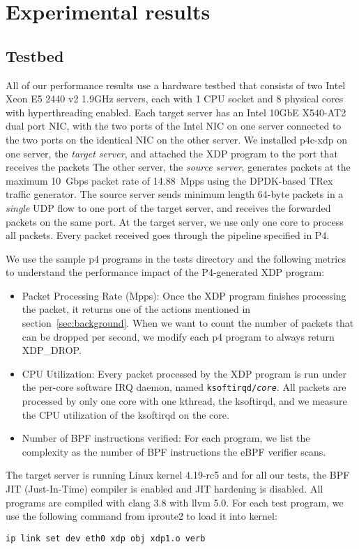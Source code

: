 \section{Experimental results}\label{sec:results}
\subsection{Testbed}
All of our performance results use a hardware testbed that consists of
two Intel Xeon E5 2440 v2 1.9GHz servers, each with 1 CPU socket and
8 physical cores with hyperthreading enabled.
Each target server has an Intel 10GbE X540-AT2 dual
port NIC, with the two ports of the Intel NIC on one server connected
to the two ports on the identical NIC on the other server.
We installed p4c-xdp on one server, the {\em target server}, and
attached the XDP program to the port that receives the packets
The other server, the {\em source server}, generates packets
at the maximum 10~Gbps packet rate of 14.88~Mpps using the DPDK-based
TRex~\cite{trex} traffic generator.  The source server sends minimum
length 64-byte packets in a {\em single} UDP flow to one port of the
target server, and receives the forwarded packets on the same port.
At the target server, we use only one core to process all packets.
Every packet received goes through the pipeline specified in P4.

We use the sample p4 programs in the tests directory and the following
metrics to understand the performance impact of the P4-generated XDP
program:
\begin{itemize}
\item Packet Processing Rate (Mpps): Once the XDP program finishes
  processing the packet, it returns one of the actions mentioned in
  section~\ref{sec:background}.  When we want to count the number of
  packets that can be dropped per second, we modify each p4 program to
  always return XDP\_DROP.
\item CPU Utilization: Every packet processed by the XDP program is run
  under the per-core software IRQ daemon, named
  \texttt{ksoftirqd/\textit{core}}.  All packets are processed by only
  one core with one kthread, the ksoftirqd, and we measure the CPU
  utilization of the ksoftirqd on the core.
\item Number of BPF instructions verified: For each program, we list
  the complexity as the number of BPF instructions the eBPF
  verifier scans.
\end{itemize}

The target server is running Linux kernel 4.19-rc5 and for all our
tests, the BPF JIT (Just-In-Time) compiler is enabled and JIT hardening
is disabled. All programs are compiled with clang 3.8 with llvm 5.0.
For each test program, we use the following
command from iproute2 to load it into kernel:
\begin{lstlisting}[frame=none]
ip link set dev eth0 xdp obj xdp1.o verb
\end{lstlisting}

